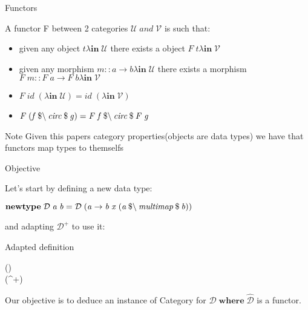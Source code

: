 \documentclass{beamer}
\newcommand{\Conid}[1]{\mathit{#1}}
\newcommand{\Varid}[1]{\mathit{#1}}
\def\resethooks{%
  \global\let\SaveRestoreHook\empty
  \global\let\ColumnHook\empty}
\let\hspre\empty
\let\hspost\empty
\begin{document}
\begin{frame}{Functors}

A functor F between 2 categories \ensuremath{\mathcal{U}\;\Varid{and}\;\mathcal{V}} is such that:
\begin{itemize}
    \item given any object \ensuremath{\Varid{t}\lambda \mathbf{in}\;\mathcal{U}} there exists a object \ensuremath{\Conid{F}\;\Varid{t}\lambda \mathbf{in}\;\mathcal{V}}
    \item given any morphism \ensuremath{\Varid{m}\mathbin{::}\Varid{a}\rightarrow \Varid{b}\lambda \mathbf{in}\;\mathcal{U}} there exists a morphism \ensuremath{\Conid{F}\;\Varid{m}\mathbin{::}\Conid{F}\;\Varid{a}\rightarrow \Conid{F}\;\Varid{b}\lambda \mathbf{in}\;\mathcal{V}}
    \item \ensuremath{\Conid{F}\;\Varid{id}\;(\lambda \mathbf{in}\;\mathcal{U})\mathrel{=}\Varid{id}\;(\lambda \mathbf{in}\;\mathcal{V})} 
    \item \ensuremath{\Conid{F}\;(\Varid{f}\mathbin{\$\char92 }\Varid{circ}\mathbin{\$}\Varid{g})\mathrel{=}\Conid{F}\;\Varid{f}\mathbin{\$\char92 }\Varid{circ}\mathbin{\$}\Conid{F}\;\Varid{g}}
\end{itemize}

\begin{block}{Note}
Given this papers category properties(objects are data types) we have that functors map types to themselfs
\end{block}

\end{frame}



\begin{frame}{Objective}

Let's start by defining a new data type:

\ensuremath{\mathbf{newtype}\;\mathcal{D}\;\Varid{a}\;\Varid{b}\mathrel{=}\mathcal{D}\;(\Varid{a}\rightarrow \Varid{b}\;\Varid{x}\;(\Varid{a}\mathbin{\$\char92 }\Varid{multimap}\mathbin{\$}\Varid{b}))}

and adapting \ensuremath{\mathcal{D}^{+}} to use it:

\begin{block}{Adapted definition}
\begin{hscode}\SaveRestoreHook
\column{B}{@{}>{\hspre}l<{\hspost}@{}}%
\column{E}{@{}>{\hspre}l<{\hspost}@{}}%
\>[B]{}\mathbin{::}(\Varid{a}\rightarrow \Varid{b})\rightarrow {}\;\Varid{a}\;\Varid{b}{}\<[E]%
\\
\>[B]{}\;\Varid{f}\mathrel{=}\;(^{+}\;\Varid{f}){}\<[E]%
\ColumnHook
\end{hscode}\resethooks
\end{block}

Our objective is to deduce an instance of Category for \ensuremath{\mathcal{D}\;\mathbf{where}\;\mathcal{\hat{D}}} is a functor.

\end{frame}
\end{document}
